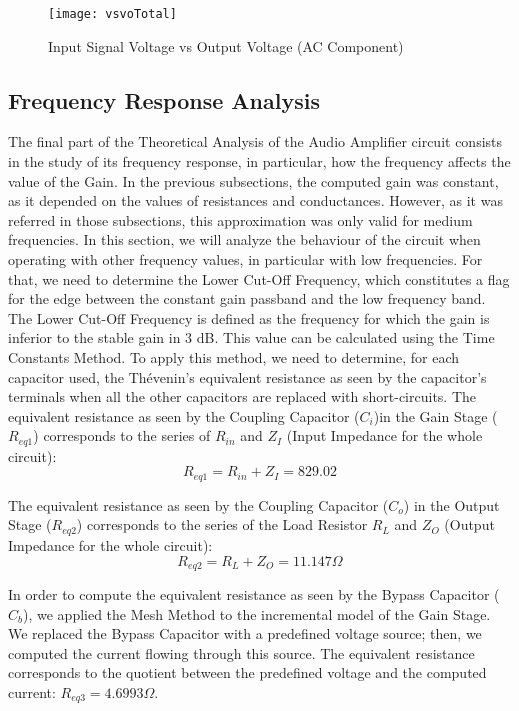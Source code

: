 \FloatBarrier
\begin{figure}[h] \centering
\texttt{[image: vsvoTotal]}
\caption{Input Signal Voltage vs Output Voltage (AC Component)}
\label{fig:vsvoTotal}
\end{figure}
\FloatBarrier

\subsection{Frequency Response Analysis}

The final part of the Theoretical Analysis of the Audio Amplifier circuit consists in the study of its frequency response, in particular, how the frequency affects the value of the Gain. In the previous subsections, the computed gain was constant, as it depended on the values of resistances and conductances. However, as it was referred in those subsections, this approximation was only valid for medium frequencies. In this section, we will analyze the behaviour of the circuit when operating with other frequency values, in particular with low frequencies.
For that, we need to determine the Lower Cut-Off Frequency, which constitutes a flag for the edge between the constant gain passband and the low frequency band. The Lower Cut-Off Frequency is defined as the frequency for which the gain is inferior to the stable gain in 3 dB. This value can be calculated using the Time Constants Method. To apply this method, we need to determine, for each capacitor used, the Thévenin's equivalent resistance as seen by the capacitor's terminals when all the other capacitors are replaced with short-circuits.
The equivalent resistance as seen by the Coupling Capacitor ($C_i$)in the Gain Stage ($R_{eq1}$) corresponds to the series of $R_{in}$ and $Z_I$ (Input Impedance for the whole circuit):
\begin{equation}
R_{eq1} = R_{in} + Z_I = 829.02
\label{eq:Req1}
\end{equation}

The equivalent resistance as seen by the Coupling Capacitor ($C_o$) in the Output Stage ($R_{eq2}$) corresponds to the series of the Load Resistor $R_L$ and $Z_O$ (Output Impedance for the whole circuit):
\begin{equation}
R_{eq2} = R_L + Z_O = 11.147 \Omega
\label{eq:Req2}
\end{equation}

In order to compute the equivalent resistance as seen by the Bypass Capacitor ($C_b$), we applied the Mesh Method to the incremental model of the Gain Stage. We replaced the Bypass Capacitor with a predefined voltage source; then, we computed the current flowing through this source. The equivalent resistance corresponds to the quotient between the predefined voltage and the computed current: $R_{eq3} = 4.6993 \Omega$.

